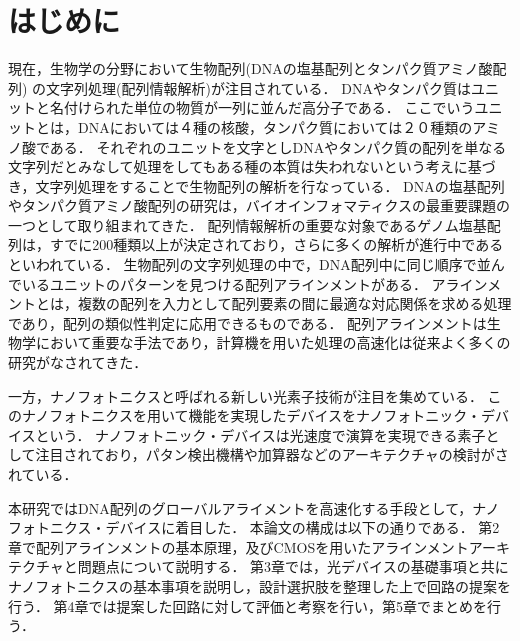 \chapter{はじめに}
現在，生物学の分野において生物配列(DNAの塩基配列とタンパク質アミノ酸配列) の文字列処理(配列情報解析)が注目されている\cite{浅井潔2000配列情報と確立モデル,後藤修1998マルチプルアラインメントは生体高分子情報の交差点}．
DNAやタンパク質はユニットと名付けられた単位の物質が一列に並んだ高分子である．
ここでいうユニットとは，DNAにおいては４種の核酸，タンパク質においては２０種類のアミノ酸である．
それぞれのユニットを文字としDNAやタンパク質の配列を単なる文字列だとみなして処理をしてもある種の本質は失われないという考えに基づき，文字列処理をすることで生物配列の解析を行なっている．
DNAの塩基配列やタンパク質アミノ酸配列の研究は，バイオインフォマティクスの最重要課題の一つとして取り組まれてきた．
配列情報解析の重要な対象であるゲノム塩基配列は，すでに200種類以上が決定されており，さらに多くの解析が進行中であるといわれている\cite{浅井潔2005バイオインフォマティクス}．
生物配列の文字列処理の中で，DNA配列中に同じ順序で並んでいるユニットのパターンを見つける配列アラインメントがある\cite{須戸里織2011バイオインフォマティクスゲノム配列から機能解析へバイオインフォマティクスゲノム配列から機能解析へ}．
アラインメントとは，複数の配列を入力として配列要素の間に最適な対応関係を求める処理であり，配列の類似性判定に応用できるものである．
配列アラインメントは生物学において重要な手法であり，計算機を用いた処理の高速化は従来よく多くの研究がなされてきた\cite{須戸里織2011gpu,宗川裕馬2008統合開発環境,sandes2011smith,liu2015accelerating,伊野文彦2007gpu}．

一方，ナノフォトニクスと呼ばれる新しい光素子技術が注目を集めている．
このナノフォトニクスを用いて機能を実現したデバイスをナノフォトニック・デバイスという．
ナノフォトニック・デバイスは光速度で演算を実現できる素子として注目されており，パタン検出機構や加算器などのアーキテクチャの検討がされている\cite{}．

本研究ではDNA配列のグローバルアライメントを高速化する手段として，ナノフォトニクス・デバイスに着目した．
本論文の構成は以下の通りである．
第2章で配列アラインメントの基本原理，及びCMOSを用いたアラインメントアーキテクチャと問題点について説明する．
第3章では，光デバイスの基礎事項と共にナノフォトニクスの基本事項を説明し，設計選択肢を整理した上で回路の提案を行う．
第4章では提案した回路に対して評価と考察を行い，第5章でまとめを行う．
